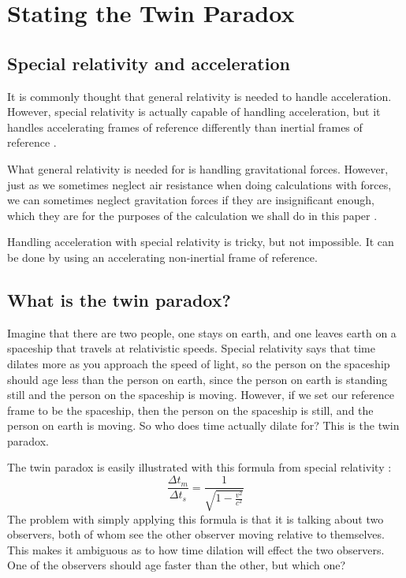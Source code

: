 \chapter{Stating the Twin Paradox}
	\section{Special relativity and acceleration}
		\label{sec:srAndAcceleration}
		It is commonly thought that general relativity is needed to handle acceleration.
		However, special relativity is actually capable of handling acceleration, but it handles accelerating frames of reference differently than inertial frames of reference \autocite{sracceleration}.

		What general relativity is needed for is handling gravitational forces.
		However, just as we sometimes neglect air resistance when doing calculations with forces, we can sometimes neglect gravitation forces if they are insignificant enough, which they are for the purposes of the calculation we shall do in this paper \autocite{sracceleration}.

		Handling acceleration with special relativity is tricky, but not impossible.
		It can be done by using an accelerating non-inertial frame of reference.
	\section{What is the twin paradox?}
		Imagine that there are two people, one stays on earth, and one leaves earth on a spaceship that travels at relativistic speeds.
		Special relativity says that time dilates more as you approach the speed of light, so the person on the spaceship should age less than the person on earth, since the person on earth is standing still and the person on the spaceship is moving.
		However, if we set our reference frame to be the spaceship, then the person on the spaceship is still, and the person on earth is moving.
		So who does time actually dilate for?
		This is the twin paradox.

		The twin paradox is easily illustrated with this formula from special relativity \autocite[p.~583]{textbook}:
		\[\frac{\Delta t_m}{\Delta t_s} = \frac{1}{\sqrt{1 - \frac{v^2}{c^2}}}\]
		The problem with simply applying this formula is that it is talking about two observers, both of whom see the other observer moving relative to themselves.
		This makes it ambiguous as to how time dilation will effect the two observers.
		One of the observers should age faster than the other, but which one?

